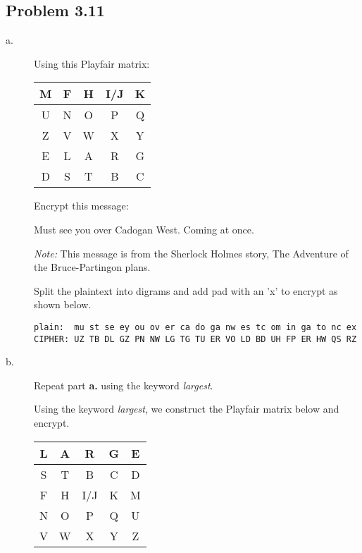 \documentclass[../hw_sols.tex]{subfiles}
\begin{document}
\newpage



\subsection*{Problem 3.11}

\begin{description}

\item[a.] Using this Playfair matrix:
\begin{center}
\begin{tabular}{ | c | c | c | c | c | }
	\hline
	M & F & H & I/J & K \\
	\hline
	U & N & O &   P & Q \\
	\hline
	Z & V & W &   X & Y \\
	\hline
	E & L & A &   R & G \\
	\hline
	D & S & T &   B & C \\
	\hline
\end{tabular}
\end{center}

Encrypt this message:
\begin{center}
	Must see you over Cadogan West. Coming at once.
\end{center}
\textit{Note:} This message is from the Sherlock Holmes story, The 
Adventure of the Bruce-Partingon plans.

\begin{solution}
Split the plaintext into digrams and add pad with an 'x' to encrypt as shown 
below.
\begin{Verbatim}
plain:  mu st se ey ou ov er ca do ga nw es tc om in ga to nc ex
CIPHER: UZ TB DL GZ PN NW LG TG TU ER VO LD BD UH FP ER HW QS RZ
\end{Verbatim}
\end{solution}

\item[b.] Repeat part \textbf{a.} using the keyword \textit{largest}.

\begin{solution}

Using the keyword \textit{largest}, we construct the Playfair matrix below 
and encrypt.
\begin{center}
\begin{tabular}{ | c | c | c | c | c | }
	\hline \rowcolor{cyan!20}
	L & A &   R & G & E \\
	\hline
	S \cellcolor{cyan!20} & T \cellcolor{cyan!20} & B & C & D \\
	\hline
	F & H & I/J & K & M \\
	\hline
	N & O &   P & Q & U \\
	\hline
	V & W &   X & Y & Z \\
	\hline
\end{tabular}
\end{center}


\end{solution}
\end{description}
\end{document}
